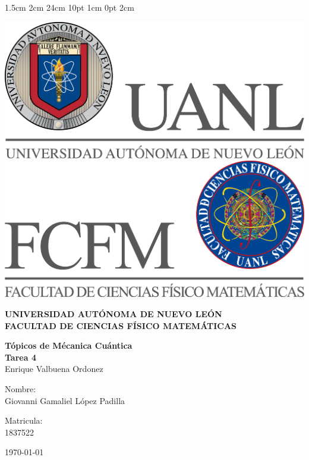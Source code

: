 \documentclass[12pt,letterpaper]{report}
\begin{document}
\setmargins{2.5cm}      
{1.5cm}                     
{2cm}  
{24cm}                    
{10pt}                          
{1cm}                          
{0pt}                             
{2cm}
\begin{titlepage}
\begin{center}
\includegraphics[scale=0.40]{../../Logos/uanl.png} 
\hspace{2.5cm}
\includegraphics[scale=0.40]{../../Logos/fcfm.png}
\end{center}
\vspace{2cm}
\begin{center}
\textbf{
UNIVERSIDAD AUTÓNOMA DE NUEVO LEÓN\\
FACULTAD DE CIENCIAS
    FÍSICO MATEMÁTICAS}\\
\vspace*{2cm}
\begin{large}
\vspace{1cm}
\large{\textbf{Tópicos de Mécanica Cuántica}}\\
\textbf{Tarea 4}\\
Enrique Valbuena Ordonez\\
\end{large}
\vspace{3.5cm}
\begin{minipage}{0.6\linewidth}
\vspace{0.5cm}
\changefontsizes{14pt}
Nombre:\\
Giovanni Gamaliel López Padilla\\
\end{minipage}
\begin{minipage}{0.2\linewidth}
\changefontsizes{14pt}
Matricula:\\
1837522
\end{minipage}
\end{center}
\vspace{4cm}
\begin{flushright}
\today
\end{flushright}
\end{titlepage}
\end{document}

